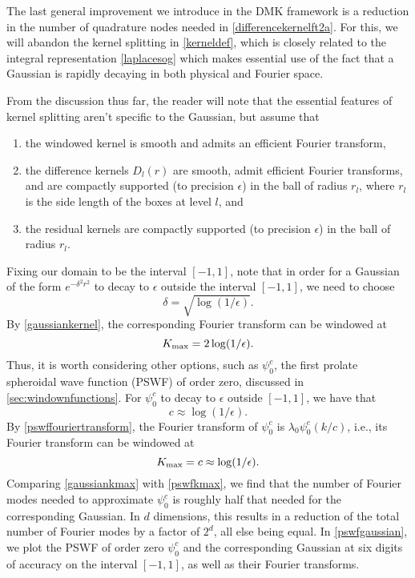 \documentclass[final,letterpaper]{siamart171218}
\newcommand{\be}{\begin{equation}}
\newcommand{\ee}{\end{equation}}
\newcommand{\psic}{{\psi_0^c}}
\newcommand{\acron}{DMK }
\newcommand{\cR}{r}
\begin{document}
The last general improvement we introduce in the \acron framework
is a reduction in the number of quadrature nodes needed in \eqref{differencekernelft2a}.
For this, we will abandon the kernel splitting in
\cref{kerneldef}, which is closely related to the integral representation \cref{laplacesog}
which makes essential use of the fact that a Gaussian is rapidly decaying in both physical
and Fourier space. 

From the discussion thus far, the reader will note that the essential features
of kernel splitting aren't specific to the Gaussian, but assume that
\begin{enumerate}[label=(\alph*)] 
\item the windowed kernel is smooth and admits an efficient Fourier transform,
\item the difference kernels $D_l(r)$ are smooth, admit efficient Fourier transforms,
  and are compactly supported (to precision $\epsilon$)
  in the ball of radius $\cR_l$,
  where $\cR_l$ is the side length of the boxes at level $l$, and
\item the residual kernels are compactly supported (to precision $\epsilon$)
  in the ball of radius $\cR_l$.
\end{enumerate}

Fixing our domain to be the interval $[-1,1]$, note that 
in order for a Gaussian of the form $e^{-\delta^2 r^2}$
to decay to $\epsilon$ outside the interval $[-1,1]$, we need to choose
\be
\delta = \sqrt{\log(1/\epsilon)}.
\ee
By \cref{gaussiankernel}, the corresponding Fourier transform can be windowed at
\be\label{gaussiankmax}
K_{\rm max}=2\log(1/\epsilon).
\ee
Thus, it is worth considering other options, such as $\psic$, the first prolate
spheroidal wave function (PSWF) of order zero, discussed in \cref{sec:windownfunctions}.
For $\psic$ to decay to $\epsilon$ outside $[-1,1]$, we have that
\be\label{pswfcvalue}
c\approx \log(1/\epsilon).
\ee
By \cref{pswffouriertransform}, the Fourier transform of $\psic$ is
$\lambda_0 \psic(k/c)$, i.e., its Fourier transform can be windowed at
\be\label{pswfkmax}
K_{\rm max}=c\approx  \log(1/\epsilon).
\ee
Comparing \cref{gaussiankmax} with \cref{pswfkmax}, we find that
the number of Fourier modes needed to approximate $\psic$ is roughly
half that needed for the corresponding Gaussian. In $d$ dimensions, this
results in a reduction of the total number of Fourier modes by a factor of $2^d$, 
all else being equal. In \cref{pswfgaussian}, we plot the PSWF of order zero $\psic$ and
the corresponding Gaussian at six digits of accuracy on the interval $[-1,1]$,
as well as their Fourier transforms. 
\end{document}
